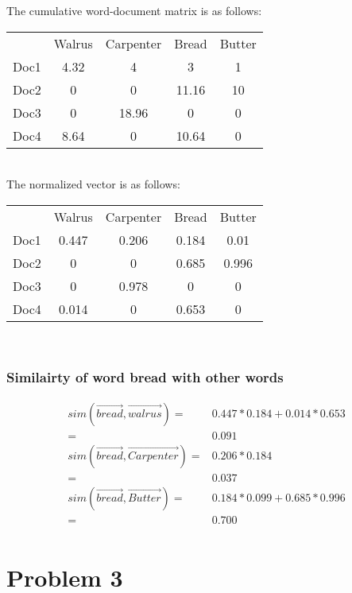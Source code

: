 \documentclass{article}
\begin{document}
The cumulative word-document matrix is as follows:

\begin{tabular}{r c c c c}
\multicolumn{1}{r}{}
 & \multicolumn{1}{c}{Walrus}
 & \multicolumn{1}{c}{Carpenter}
 & \multicolumn{1}{c}{Bread}
 & \multicolumn{1}{c}{Butter} \\
\cline{2-5}
Doc1 & 4.32 & 4 & 3 & 1 \\
\cline{2-5}
Doc2 & 0 & 0 & 11.16 & 10 \\
\cline{2-5}
Doc3 & 0 & 18.96 & 0 & 0 \\
\cline{2-5}
Doc4 & 8.64 & 0 & 10.64 & 0 \\
\cline{2-5}
\end{tabular} \\

The normalized vector is as follows: \\

\begin{tabular}{r c c c c}
\multicolumn{1}{r}{}
 & \multicolumn{1}{c}{Walrus}
 & \multicolumn{1}{c}{Carpenter}
 & \multicolumn{1}{c}{Bread}
 & \multicolumn{1}{c}{Butter} \\
\cline{2-5}
Doc1 & 0.447 & 0.206 & 0.184 & 0.01 \\
\cline{2-5}
Doc2 & 0 & 0 & 0.685 & 0.996 \\
\cline{2-5}
Doc3 & 0 & 0.978 & 0 & 0 \\
\cline{2-5}
Doc4 & 0.014 & 0 & 0.653 & 0 \\
\cline{2-5}
\end{tabular} \\

\subsubsection*{Similairty of word bread with other words}
\begin{align*}
  sim(\vec{bread},\vec{walrus}) =& 0.447*0.184 + 0.014 * 0.653\\
  =& 0.091 \\ 
  sim(\vec{bread},\vec{Carpenter}) =& 0.206 * 0.184 \\
  =& 0.037 \\
  sim(\vec{bread},\vec{Butter}) =& 0.184*0.099 + 0.685 * 0.996 \\
  =& 0.700 \\
\end{align*}

\section[C]{Problem 3}
\end{document}
